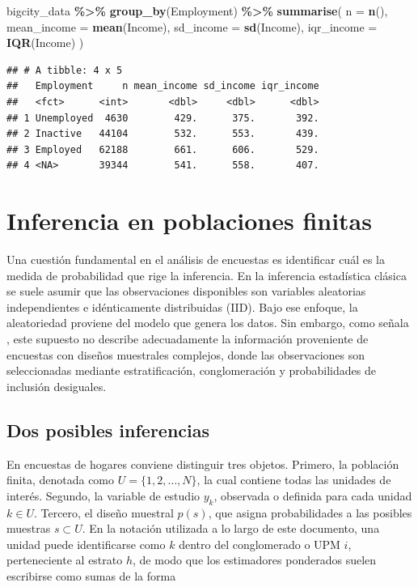 \documentclass[
  spanish,
  12pt,
]{book}
\newenvironment{Shaded}{\begin{snugshade}}{\end{snugshade}}
\newcommand{\AttributeTok}[1]{\textcolor[rgb]{0.13,0.29,0.53}{#1}}
\newcommand{\FunctionTok}[1]{\textcolor[rgb]{0.13,0.29,0.53}{\textbf{#1}}}
\newcommand{\NormalTok}[1]{#1}
\newcommand{\SpecialCharTok}[1]{\textcolor[rgb]{0.81,0.36,0.00}{\textbf{#1}}}
\begin{document}
\begin{Shaded}
\begin{Highlighting}[]
\NormalTok{bigcity\_data }\SpecialCharTok{\%\textgreater{}\%}
  \FunctionTok{group\_by}\NormalTok{(Employment) }\SpecialCharTok{\%\textgreater{}\%}
  \FunctionTok{summarise}\NormalTok{(}
    \AttributeTok{n =} \FunctionTok{n}\NormalTok{(),}
    \AttributeTok{mean\_income =} \FunctionTok{mean}\NormalTok{(Income),}
    \AttributeTok{sd\_income =} \FunctionTok{sd}\NormalTok{(Income),}
    \AttributeTok{iqr\_income =} \FunctionTok{IQR}\NormalTok{(Income)}
\NormalTok{  )}
\end{Highlighting}
\end{Shaded}

\begin{verbatim}
## # A tibble: 4 x 5
##   Employment     n mean_income sd_income iqr_income
##   <fct>      <int>       <dbl>     <dbl>      <dbl>
## 1 Unemployed  4630        429.      375.       392.
## 2 Inactive   44104        532.      553.       439.
## 3 Employed   62188        661.      606.       529.
## 4 <NA>       39344        541.      558.       407.
\end{verbatim}

\chapter{Inferencia en poblaciones finitas}\label{ap2}

Una cuestión fundamental en el análisis de encuestas es identificar cuál es la medida de probabilidad que rige la inferencia. En la inferencia estadística clásica se suele asumir que las observaciones disponibles son variables aleatorias independientes e idénticamente distribuidas (IID). Bajo ese enfoque, la aleatoriedad proviene del modelo que genera los datos. Sin embargo, como señala \citet{kish1987statistical}, este supuesto no describe adecuadamente la información proveniente de encuestas con diseños muestrales complejos, donde las observaciones son seleccionadas mediante estratificación, conglomeración y probabilidades de inclusión desiguales.

\section{Dos posibles inferencias}\label{dos-posibles-inferencias}

En encuestas de hogares conviene distinguir tres objetos. Primero, la población finita, denotada como \(U = \{1,2,\ldots,N\}\), la cual contiene todas las unidades de interés. Segundo, la variable de estudio \(y_k\), observada o definida para cada unidad \(k \in U\). Tercero, el diseño muestral \(p(s)\), que asigna probabilidades a las posibles muestras \(s \subset U\). En la notación utilizada a lo largo de este documento, una unidad puede identificarse como \(k\) dentro del conglomerado o UPM \(i\), perteneciente al estrato \(h\), de modo que los estimadores ponderados suelen escribirse como sumas de la forma
\end{document}
